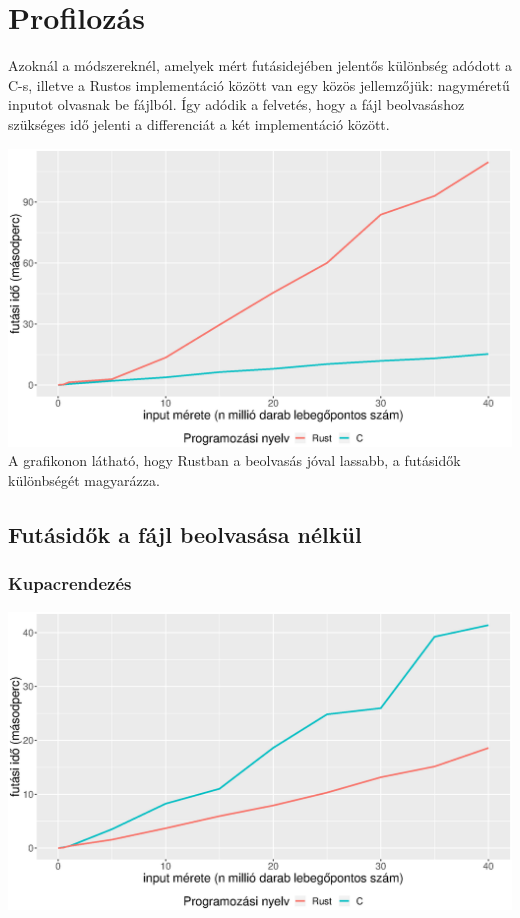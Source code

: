 
\section{Profilozás}
Azoknál a módszereknél, amelyek mért futásidejében jelentős különbség adódott a C-s, illetve a Rustos implementáció között van egy közös jellemzőjük: nagyméretű inputot olvasnak be fájlból. Így adódik a felvetés, hogy a fájl beolvasáshoz szükséges idő jelenti a differenciát a két implementáció között.

\includegraphics[width=15.5cm]{kepek/file_read.eps}
A grafikonon látható, hogy Rustban a beolvasás jóval lassabb, a futásidők különbségét magyarázza.
\subsection{Futásidők a fájl beolvasása nélkül}
\subsubsection{Kupacrendezés}
\includegraphics[width=15.5cm]{kepek/heap_sort_run_without_read.eps}
